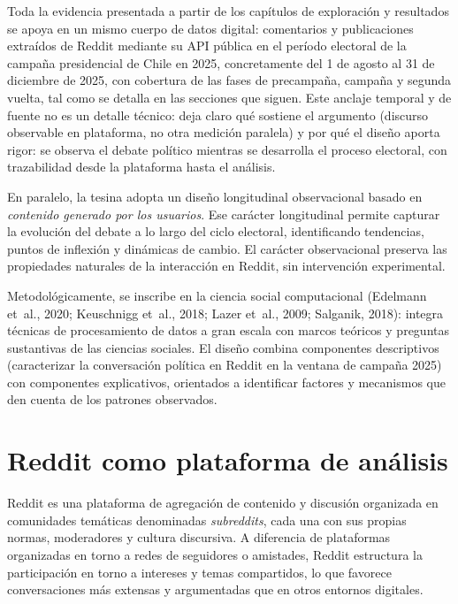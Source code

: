 \documentclass[
  letterpaper,
  numbers=noendperiod,
  fontsize=11pt,
  DIV=12,
  titlepage=false]{scrreprt}
\begin{document}
Toda la evidencia presentada a partir de los capítulos de exploración y
resultados se apoya en un mismo cuerpo de datos digital: comentarios y
publicaciones extraídos de Reddit mediante su API pública en el período
electoral de la campaña presidencial de Chile en 2025, concretamente del
1 de agosto al 31 de diciembre de 2025, con cobertura de las fases de
precampaña, campaña y segunda vuelta, tal como se detalla en las
secciones que siguen. Este anclaje temporal y de fuente no es un detalle
técnico: deja claro qué sostiene el argumento (discurso observable en
plataforma, no otra medición paralela) y por qué el diseño aporta rigor:
se observa el debate político mientras se desarrolla el proceso
electoral, con trazabilidad desde la plataforma hasta el análisis.

En paralelo, la tesina adopta un diseño longitudinal observacional
basado en \emph{contenido generado por los usuarios}. Ese carácter
longitudinal permite capturar la evolución del debate a lo largo del
ciclo electoral, identificando tendencias, puntos de inflexión y
dinámicas de cambio. El carácter observacional preserva las propiedades
naturales de la interacción en Reddit, sin intervención experimental.

Metodológicamente, se inscribe en la ciencia social computacional
(Edelmann et~al., 2020; Keuschnigg et~al., 2018; Lazer et~al., 2009;
Salganik, 2018): integra técnicas de procesamiento de datos a gran
escala con marcos teóricos y preguntas sustantivas de las ciencias
sociales. El diseño combina componentes descriptivos (caracterizar la
conversación política en Reddit en la ventana de campaña 2025) con
componentes explicativos, orientados a identificar factores y mecanismos
que den cuenta de los patrones observados.

\section{Reddit como plataforma de
análisis}\label{reddit-como-plataforma-de-anuxe1lisis}

Reddit es una plataforma de agregación de contenido y discusión
organizada en comunidades temáticas denominadas \emph{subreddits}, cada
una con sus propias normas, moderadores y cultura discursiva. A
diferencia de plataformas organizadas en torno a redes de seguidores o
amistades, Reddit estructura la participación en torno a intereses y
temas compartidos, lo que favorece conversaciones más extensas y
argumentadas que en otros entornos digitales.
\end{document}
